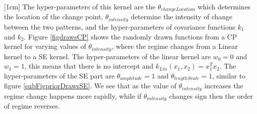 [1cm]
The hyper-parameters of this kernel are the $\theta_{changeLocation}$ which determines the location of the change point, $\theta_{intensity}$ determine the intensity of change between the two patterns, and the hyper-parameters of covariance functions $k_{1}$ and $k_2$. Figure \ref{figdrawsCP} shows the randomly drawn functions from a CP kernel for varying values of $\theta_{intensity}$, where the regime changes from a Linear kernel to a SE kernel. The hyper-parameters of the linear kernel are $w_{0}=0$ and $w_{1}=1$, this means that there is no intercept and $k_{Lin}(x_{1}, x_{2}) = x_{1}^T x_{2}$. The hyper-parameters of the SE part are $\theta_{amplitude}=1$ and $\theta_{lengthScale}=1$, similar to figure \ref{subFigpriorDrawsSE}. We see that as the value of $\theta_{intensity}$ increases the regime change happens more rapidly, while if $\theta_{intensity}$ changes sign then the order of regime reverses.


